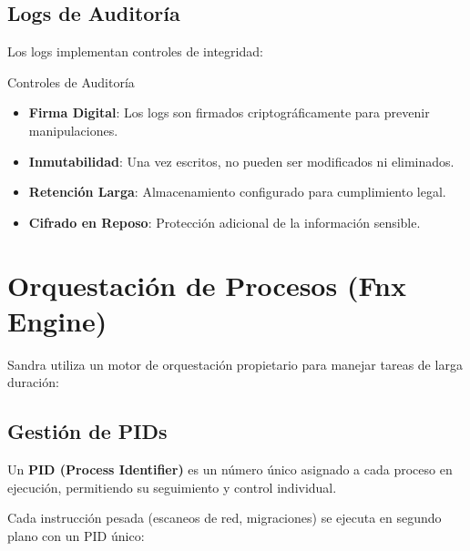 
\subsection{Logs de Auditoría}

Los logs implementan controles de integridad:

\begin{caja}{Controles de Auditoría}
\begin{itemize}
\item \textbf{Firma Digital}: Los logs son firmados criptográficamente para prevenir manipulaciones.
\item \textbf{Inmutabilidad}: Una vez escritos, no pueden ser modificados ni eliminados.
\item \textbf{Retención Larga}: Almacenamiento configurado para cumplimiento legal.
\item \textbf{Cifrado en Reposo}: Protección adicional de la información sensible.
\end{itemize}
\end{caja}


\section{Orquestación de Procesos (Fnx Engine)}

Sandra utiliza un motor de orquestación propietario para manejar tareas de larga duración:

\subsection{Gestión de PIDs}

\begin{definicion}
Un \textbf{PID (Process Identifier)} es un número único asignado a cada proceso en ejecución, permitiendo su seguimiento y control individual.
\end{definicion}


Cada instrucción pesada (escaneos de red, migraciones) se ejecuta en segundo plano con un PID único:

